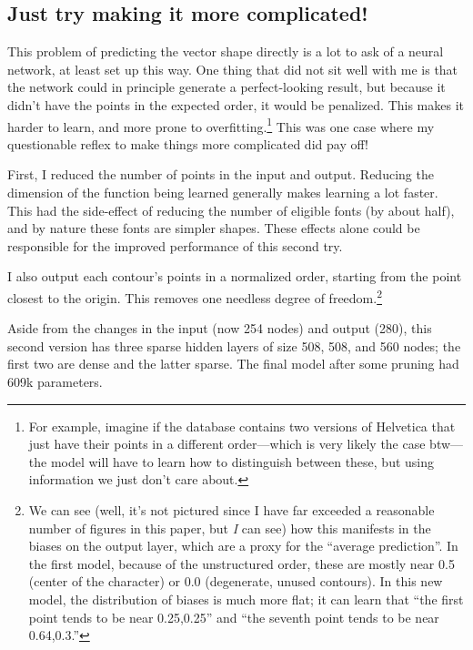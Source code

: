 \documentclass[twocolumn]{article}
\begin{document}
\subsection{Just try making it more complicated!} \label{sec:complicated}

This problem of predicting the vector shape directly is a lot to ask
of a neural network, at least set up this way. One thing that did not
sit well with me is that the network could in principle generate a
perfect-looking result, but because it didn't have the points in the
expected order, it would be penalized. This makes it harder to learn,
and more prone to overfitting.\footnote{For example, imagine if the database
contains two versions of Helvetica that just have their points in a
different order---which is very likely the case btw---the model will
have to learn how to distinguish between these, but using information
we just don't care about.} This was one case where my questionable
reflex to make things more complicated did pay off!

First, I reduced the number of points in the input and output.
Reducing the dimension of the function being learned generally makes
learning a lot faster. This had the side-effect of reducing the number
of eligible fonts (by about half), and by nature these fonts are
simpler shapes. These effects alone could be responsible for the
improved performance of this second try.

I also output each contour's points in a normalized order, starting
from the point closest to the origin. This removes one needless degree
of freedom.\footnote{We can see (well, it's not pictured since I have
  far exceeded a reasonable number of figures in this paper, but {\em
    I} can see) how this manifests in the biases on the output layer,
  which are a proxy for the ``average prediction''. In the first
  model, because of the unstructured order, these are mostly near 0.5
  (center of the character) or 0.0 (degenerate, unused contours). In
  this new model, the distribution of biases is much more flat; it can
  learn that ``the first point tends to be near 0.25,0.25'' and ``the
  seventh point tends to be near 0.64,0.3.''}

Aside from the changes in the input (now 254 nodes) and output (280),
this second version has three sparse hidden layers of size 508, 508,
and 560 nodes; the first two are dense and the latter sparse. The
final model after some pruning had 609k parameters.
\end{document}
